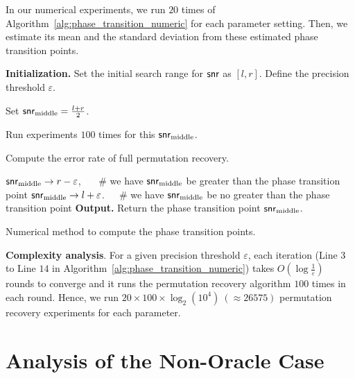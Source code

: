 \documentclass[11pt]{article}
\begin{document}
In our numerical experiments, we run $20$ times of Algorithm~\ref{alg:phase_transition_numeric}  for each parameter setting. Then, we estimate its mean and the standard deviation from these estimated phase transition points.


\vspace{0.2in}


\begin{algorithm}[!ht]
\begin{algorithmic}[1]

\STATE
\textbf{Initialization.} Set the initial search range for $\mathsf{snr}$ as $[l, r]$.
Define the precision threshold $\varepsilon$.

\STATE
{}

\STATE Set $\mathsf{snr}_{\textup{middle}} = \frac{l + r}{2}$.


\STATE Run experiments $100$ times for this $\mathsf{snr}_{\textup{middle}}$.

\STATE Compute the error rate of full permutation recovery.

\STATE
{}
\STATE $\mathsf{snr}_{\textup{middle}} \rightarrow r - \varepsilon$, ~~~\# we have  $\mathsf{snr}_{\textup{middle}}$ be greater than the phase transition point
\ELSE
\STATE $\mathsf{snr}_{\textup{middle}} \rightarrow l + \varepsilon$.~~~\# we have  $\mathsf{snr}_{\textup{middle}}$ be no greater than the phase transition point
\ENDIF
\STATE
\ENDWHILE
\STATE
\STATE
\textbf{Output.} Return the phase transition point $\mathsf{snr}_{\textup{middle}}$.
\end{algorithmic}
\caption{Numerical method to compute the phase transition points.}
\label{alg:phase_transition_numeric}
\end{algorithm}

\vspace{0.2in}
\noindent \textbf{Complexity analysis}. For a given precision threshold $\varepsilon$, each iteration (Line $3$ to Line $14$ in Algorithm~\ref{alg:phase_transition_numeric}) takes $O(\log \frac{1}{\varepsilon})$ rounds to converge and it runs the permutation recovery algorithm $100$ times in each round. Hence, we run $20\times 100\times \log_2(10^4)~(\approx 26575)$ permutation recovery experiments for each parameter.

\newpage


\section{Analysis of the Non-Oracle Case}
\label{sec:non_oracle_case}
\end{document}
